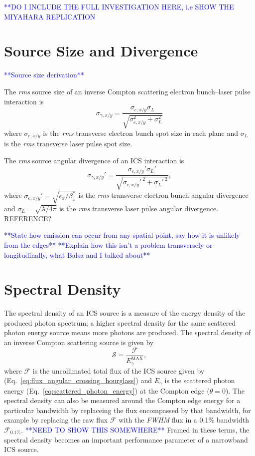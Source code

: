 \documentclass[../main.tex]{subfiles}
\begin{document}
\textcolor{blue}{**DO I INCLUDE THE FULL INVESTIGATION HERE, i.e SHOW THE MIYAHARA REPLICATION}

\section{Source Size and Divergence}
\textcolor{blue}{**Source size derivation**}

The \textit{rms} source size of an inverse Compton scattering electron bunch--laser pulse interaction is 
\begin{equation}
\sigma_{\gamma,x/y} = \frac{\sigma_{e,x/y}\sigma_{L}}{\sqrt{\sigma_{e,x/y}^{2}+\sigma_{L}^{2}}}
\label{eq:source_size}
\end{equation}
where $\sigma_{e,x/y}$ is the \textit{rms} transverse electron bunch spot size in each plane and $\sigma_{L}$ is the \textit{rms} transverse laser pulse spot size.  

The \textit{rms} source angular divergence of an ICS interaction is
\begin{equation}
\sigma_{\gamma,x/y}' = \frac{\sigma_{e,x/y}'\sigma_{L}'}{\sqrt{\sigma_{e,x/y}'^{~2}+\sigma_{L}'^{~2}}},
\label{eq:source_divergence}
\end{equation}
where $\sigma_{e,x/y}' = \sqrt{\epsilon_{x}/\beta_{x}^{*}}$ is the \textit{rms} transverse electron bunch angular divergence and $\sigma_{L} = \sqrt{\lambda/4\pi}$ is the \textit{rms} transverse laser pulse angular divergence. REFERENCE?


\textcolor{blue}{**State how emission can occur from any spatial point, say how it is unlikely from the edges**}
\textcolor{blue}{**Explain how this isn't a problem transversely or longitudinally, what Balsa and I talked about**}



\section{Spectral Density}

The spectral density of an ICS source is a measure of the energy density of the produced photon spectrum; a higher spectral density for the same scattered photon energy source means more photons are produced. The spectral density of an inverse Compton scattering source is given by
\begin{equation}
\mathcal{S} = \frac{\mathcal{F}}{E_{\gamma}^{\mathrm{MAX}}},
\label{eq:spectral_density}    
\end{equation}
where $\mathcal{F}$ is the uncollimated total flux of the ICS source given by (Eq.~\ref{eq:flux_angular_crossing_hourglass}) and $E_{\gamma}$ is the scattered photon energy (Eq.~\ref{eq:scattered_photon_energy}) at the Compton edge ($\theta = 0$). The spectral density can also be measured around the Compton edge energy for a particular bandwidth by replaceing the flux encompassed by that bandwidth, for example by replacing the raw flux $\mathcal{F}$ with the \textit{FWHM} flux in a 0.1\% bandwidth $\mathcal{F_{\mathrm{0.1\%}}}$. \textcolor{blue}{**NEED TO SHOW THIS SOMEWHERE**} Framed in these terms, the spectral density becomes an important performance parameter of a narrowband ICS source.  
\end{document}

